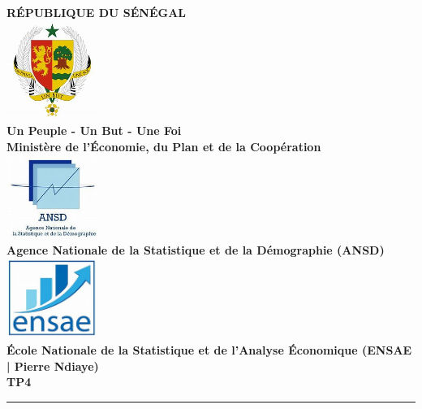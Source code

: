 \documentclass[
]{article}
\author{}
\date{\vspace{-2.5em}}
\begin{document}
\begin{titlepage}
    \begin{center}
        \sffamily 
        {\Large \textbf{RÉPUBLIQUE DU SÉNÉGAL}}\\[0.3cm]
        \includegraphics[width=3cm]{../Donnees/LOGO3.jpg} \\[0.3cm]
        
        {\large \textbf{Un Peuple - Un But - Une Foi}}\\[0.5cm]
        
        {\Large \textbf{Ministère de l'Économie, du Plan et de la Coopération}}\\[0.5cm]
        
        \includegraphics[width=3cm]{../Donnees/LOGO2.jpg} \\[0.3cm]
        
        {\Large \textbf{Agence Nationale de la Statistique et de la Démographie (ANSD)}}\\[0.5cm]
        
        \includegraphics[width=3cm]{../Donnees/LOGO1.jpg} \\[0.3cm]
        
        {\LARGE \textbf{École Nationale de la Statistique et de l'Analyse Économique (ENSAE | Pierre Ndiaye)}}\\[0.8cm]
        
        \textbf{\Huge \color{blue} TP4}\\[0.6cm]
        \rule{\linewidth}{0.6mm} \\[1cm]
        

\end{center}
\end{titlepage}
\end{document}
